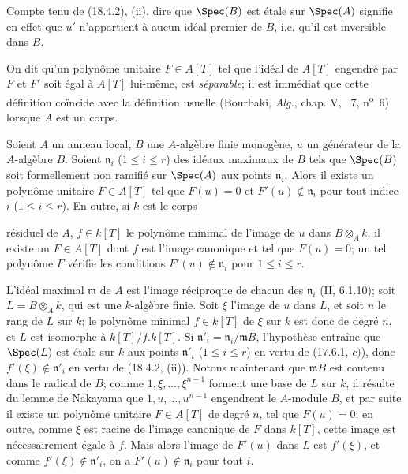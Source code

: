 Compte tenu de (18.4.2), (ii), dire que $\Spec(B)$ est étale sur $\Spec(A)$ signifie en effet que $u'$ n'appartient à aucun idéal premier de $B$, i.e. qu'il est inversible dans $B$.

On dit qu'un polynôme unitaire $F\in A[T]$ tel que l'idéal de $A[T]$ engendré par $F$ et $F'$ soit égal à $A[T]$ lui-même, est \emph{séparable}; il est immédiat que cette définition coïncide avec la définition usuelle (Bourbaki, \emph{Alg.}, chap. V, \textsection~7, n\textsuperscript{o}~6) lorsque $A$ est un corps.

\begin{lemma}[18.4.4]
\label{IV.18.4.4}
Soient $A$ un anneau local, $B$ une $A$-algèbre finie monogène, $u$ un générateur de la $A$-algèbre $B$. Soient $\mathfrak n_i$ ($1\leq i\leq r$) des idéaux maximaux de $B$ tels que $\Spec(B)$ soit formellement non ramifié sur $\Spec(A)$ aux points $\mathfrak n_i$. Alors il existe un polynôme unitaire $F\in A[T]$ tel que $F(u)=0$ et $F'(u)\notin\mathfrak n_i$ pour tout indice $i$ ($1\leq i\leq r$). En outre, si $k$ est le corps


résiduel de $A$, $f\in k[T]$ le polynôme minimal de l'image de $u$ dans $B\otimes_A k$, il existe un $F\in A[T]$ dont $f$ est l'image canonique et tel que $F(u)=0$; un tel polynôme $F$ vérifie les conditions $F'(u)\notin\mathfrak n_i$ pour $1\leq i\leq r$.
\end{lemma}

L'idéal maximal $\mathfrak m$ de $A$ est l'image réciproque de chacun des $\mathfrak n_i$ (II, 6.1.10); soit $L=B\otimes_A k$, qui est une $k$-algèbre finie. Soit $\xi$ l'image de $u$ dans $L$, et soit $n$ le rang de $L$ sur $k$; le polynôme minimal $f\in k[T]$ de $\xi$ sur $k$ est donc de degré $n$, et $L$ est isomorphe à $k[T]/f.k[T]$. Si $\mathfrak n'_i=\mathfrak n_i/\mathfrak mB$, l'hypothèse entraîne que $\Spec(L)$ est étale sur $k$ aux points $\mathfrak n'_i$ ($1\leq i\leq r$) en vertu de (17.6.1, $c)$), donc $f'(\xi)\notin\mathfrak n'_i$ en vertu de (18.4.2, (ii)). Notons maintenant que $\mathfrak mB$ est contenu dans le radical de $B$; comme $1,\xi,\ldots,\xi^{n-1}$ forment une base de $L$ sur $k$, il résulte du lemme de Nakayama que $1,u,\ldots,u^{n-1}$ engendrent le $A$-module $B$, et par suite il existe un polynôme unitaire $F\in A[T]$ de degré $n$, tel que $F(u)=0$; en outre, comme $\xi$ est racine de l'image canonique de $F$ dans $k[T]$, cette image est nécessairement égale à $f$. Mais alors l'image de $F'(u)$ dans $L$ est $f'(\xi)$, et comme $f'(\xi)\notin\mathfrak n'_i$, on a $F'(u)\notin\mathfrak n_i$ pour tout $i$.

